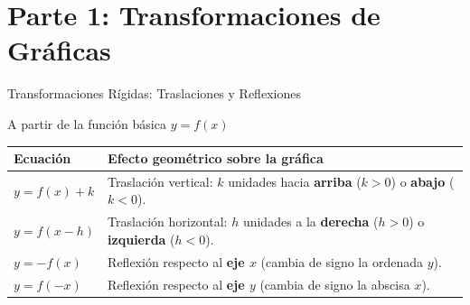 \documentclass[aspectratio=169]{beamer}
\begin{document}
\begin{frame}[plain]
  \titlepage
\end{frame}

\section{Parte 1: Transformaciones de Gráficas}


\begin{frame}{Transformaciones Rígidas: Traslaciones y Reflexiones}
  \begin{block}{A partir de la función básica $y = f(x)$}
    \begin{center}
      \small
      \begin{tabular}{lp{8cm}}
        \toprule
        \textbf{Ecuación} & \textbf{Efecto geométrico sobre la gráfica} \\
        \midrule
        $y = f(x) + k$ & Traslación vertical: $k$ unidades hacia \textbf{arriba} ($k > 0$) o \textbf{abajo} ($k < 0$). \\
        $y = f(x - h)$ & Traslación horizontal: $h$ unidades a la \textbf{derecha} ($h > 0$) o \textbf{izquierda} ($h < 0$). \\
        $y = -f(x)$ & Reflexión respecto al \textbf{eje $x$} (cambia de signo la ordenada $y$). \\
        $y = f(-x)$ & Reflexión respecto al \textbf{eje $y$} (cambia de signo la abscisa $x$). \\
        \bottomrule
      \end{tabular}
    \end{center}
  \end{block}
\end{frame}
\end{document}
